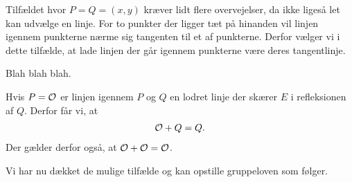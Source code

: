Tilfældet hvor $P=Q=(x, y)$ kræver lidt flere overvejelser, da ikke ligeså
let kan udvælge en linje. For to punkter der ligger tæt på hinanden vil linjen
igennem punkterne nærme sig tangenten til et af punkterne. Derfor vælger vi i
dette tilfælde, at lade linjen der går igennem punkterne være deres tangentlinje.

Blah blah blah.

Hvis $P=\mathcal{O}$ er linjen igennem $P$ og $Q$ en lodret linje der skærer $E$ i
refleksionen af $Q$. Derfor får vi, at 
\begin{align*}
	\mathcal{O} + Q = Q.
\end{align*}
Der gælder derfor også, at $\mathcal{O} + \mathcal{O} = \mathcal{O}$.

Vi har nu dækket de mulige tilfælde og kan opstille gruppeloven som følger.



